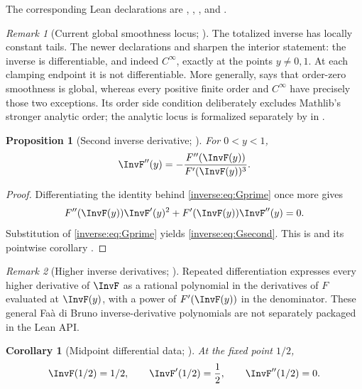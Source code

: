 \documentclass[11pt,oneside]{article}
\newtheorem{proposition}[proposition]{Proposition}
\newtheorem{corollary}[corollary]{Corollary}
\theoremstyle{definition}
\theoremstyle{remark}
\newtheorem{remark}[remark]{Remark}
\begin{document}
The corresponding Lean declarations are ,
,
, and
.

\begin{remark}[Current global smoothness locus; \Formalized]
The totalized inverse has locally constant tails.  The newer declarations
 and
 sharpen the interior statement: the
inverse is differentiable, and indeed \(C^\infty\), exactly at the points
\(y\ne0,1\).  At each clamping endpoint it is not differentiable.  More
generally,  says that order-zero smoothness is
global, whereas every positive finite order and \(C^\infty\) have precisely
those two exceptions.  Its order side condition deliberately excludes
Mathlib's stronger analytic order; the analytic locus is formalized separately by
 in .
\end{remark}

\begin{proposition}[Second inverse derivative; \Formalized]
\label{inverse:prop:inverse-second-derivative}
For $0<y<1$,
\begin{equation}
 \InvF''(y)
   =-\frac{F''(\InvF(y))}
           {F'(\InvF(y))^3}.
 \label{inverse:eq:Gsecond}
\end{equation}
\end{proposition}

\begin{proof}
Differentiating the identity behind \eqref{inverse:eq:Gprime} once more gives
\[
 F''(\InvF(y))\InvF'(y)^2+
 F'(\InvF(y))\InvF''(y)=0.
\]
Substitution of \eqref{inverse:eq:Gprime} yields \eqref{inverse:eq:Gsecond}.  This is
 and its pointwise corollary
.
\end{proof}

\begin{remark}[Higher inverse derivatives; \Derived]
Repeated differentiation expresses every higher derivative of $\InvF$ as a
rational polynomial in the derivatives of $F$ evaluated at $\InvF(y)$, with a
power of $F'(\InvF(y))$ in the denominator.  These general Fa\`a di Bruno
inverse-derivative polynomials are not separately packaged in the Lean API.
\end{remark}

\begin{corollary}[Midpoint differential data; \Formalized]
\label{inverse:cor:midpoint-inverse}
At the fixed point $1/2$,
\[
 \InvF(1/2)=1/2,\qquad
 \InvF'(1/2)=\frac12,\qquad
 \InvF''(1/2)=0.
\]
\end{corollary}
\end{document}
